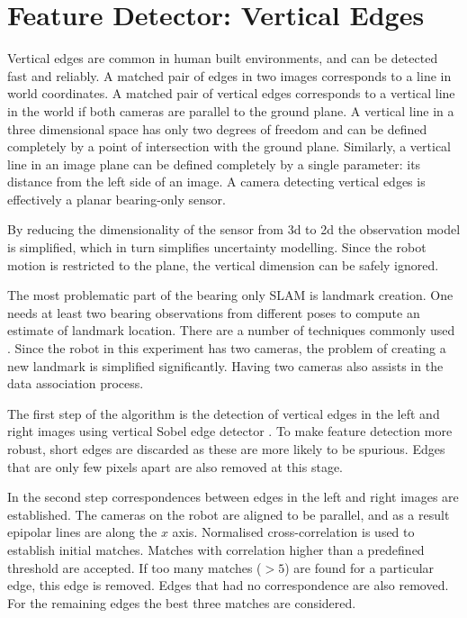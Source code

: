\section{Feature Detector: Vertical Edges}

Vertical edges are common in human built environments, and can be
detected fast and reliably. A matched pair of edges in two images
corresponds to a line in world coordinates. A matched pair of vertical
edges corresponds to a vertical line in the world if both
cameras are parallel to the ground plane. A vertical line in a three
dimensional space has only two degrees of freedom and can be defined
completely by a point of intersection with the ground plane. Similarly,
a vertical line in an image plane can be defined completely by a
single parameter: its distance from the left side of an image. A
camera detecting vertical edges is effectively a planar bearing-only
sensor.

By reducing the dimensionality of the sensor from 3d to 2d the
observation model is simplified, which in turn simplifies uncertainty
modelling. Since the robot motion is restricted to the plane, the
vertical dimension can be safely ignored.

The most problematic part of the bearing only SLAM is landmark
creation. One needs at least two bearing observations from different
poses to compute an estimate of landmark location. There are a
number of techniques commonly used \cite{bearing_only_slam}. Since the
robot in this experiment has two cameras, the problem of creating a
new landmark is simplified significantly. Having two cameras also
assists in the data association process. 

The first step of the algorithm is the detection of vertical edges in
the left and right images using vertical Sobel edge detector
\cite{Hartley2004}. To make feature detection more robust, short edges
are discarded as these are more likely to be spurious. Edges that are
only few pixels apart are also removed at this stage.

In the second step correspondences between edges in the left and right
images are established. The cameras on the robot are aligned to be
parallel, and as a result epipolar lines are along the $x$
axis\cite{Hartley2004}. Normalised cross-correlation is used to
establish initial matches. Matches with correlation higher than a
predefined threshold are accepted. If too many matches ($>5$) are
found for a particular edge, this edge is removed. Edges that had no
correspondence are also removed. For the remaining edges the best
three matches are considered.


